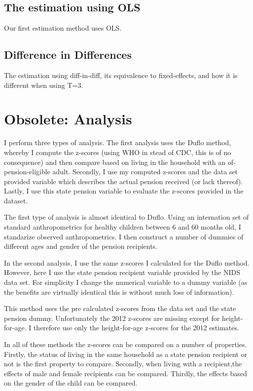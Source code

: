 \documentclass[a4paper]{report}
\begin{document}
\begin{refsection}
\subsection{The estimation using OLS}
Our first estimation method uses OLS.

\subsection{Difference in Differences}
The estimation using diff-in-diff, its equivalence to fixed-effects, and how it is different when using T=3.






\section{Obsolete: Analysis}
\label{sa:analysis}
I perform three types of analysis.
The first analysis uses the Duflo method, whereby I compute the z-scores (using WHO in stead of CDC, this is of no consequence)
and then compare based on living in the household with an of-pension-eligible adult.
Secondly, I use my computed z-scores and the data set provided variable which describes the actual pension received (or lack thereof).
Lastly, I use this state pension variable to evaluate the z-scores provided in the dataset.

The first type of analysis is almost identical to Duflo.
Using an internation set of standard anthropometrics for healthy children between 6 and 60 months old, I standarize observed anthropometrics.
I then construct a number of dummies of different ages and gender of the pension recipients.

In the second analysis, I use the same z-scores I calculated for the Duflo method.
However, here I use the state pension recipient variable provided by the NIDS data set.
For simplicity I change the numerical variable to a dummy variable (as the benefits are virtually identical this is without much loss of information).

This method uses the pre calculated z-scores from the data set and the state pension dummy.
Unfortunately the 2012 z-scores are missing except for height-for-age.
I therefore use only the height-for-age z-scores for the 2012 estimates.

In all of these methods the z-scores can be compared on a number of properties.
Firstly, the status of living in the same household as a state pension recipient or not is the first property to compare.
Secondly, when living with a recipient,the effects of male and female recipients can be compared.
Thirdly, the effects based on the gender of the child can be compared.

\printbibliography
\end{refsection}
\end{document}
